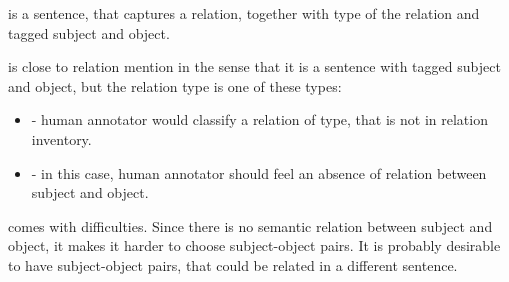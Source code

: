  is a sentence, that captures a relation, together with type of the relation and tagged subject and object. 

 is close to relation mention in the sense that it is a sentence with tagged subject and object, but the relation type is one of these types: 
\begin{itemize}
\item {} - human annotator would classify a relation of type, that is not in relation inventory. 
\item {} - in this case, human annotator should feel an absence of relation between subject and object.  

\end{itemize}

 comes with difficulties. Since there is no semantic relation between subject and object, it makes it harder to choose subject-object pairs. It is probably desirable to have subject-object pairs, that could be related in a different sentence. 

 
